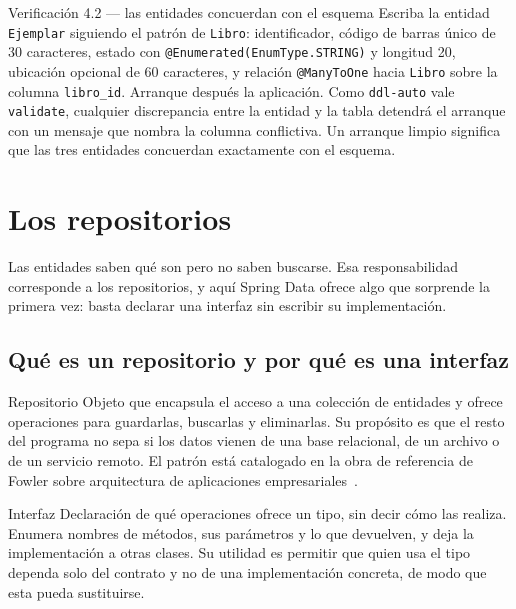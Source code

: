 \documentclass[11pt,a4paper,openany]{book}
\begin{document}
\begin{cajaejercicio}{Verificación 4.2 --- las entidades concuerdan con el esquema}
	Escriba la entidad \texttt{Ejemplar} siguiendo el patrón de \texttt{Libro}: identificador, código de barras único de 30 caracteres, estado con \texttt{@Enumerated(EnumType.STRING)} y longitud 20, ubicación opcional de 60 caracteres, y relación \texttt{@ManyToOne} hacia \texttt{Libro} sobre la columna \texttt{libro\_id}. Arranque después la aplicación. Como \texttt{ddl-auto} vale \texttt{validate}, cualquier discrepancia entre la entidad y la tabla detendrá el arranque con un mensaje que nombra la columna conflictiva. Un arranque limpio significa que las tres entidades concuerdan exactamente con el esquema.
\end{cajaejercicio}

\section{Los repositorios}
\label{sec:repositorios}

Las entidades saben qué son pero no saben buscarse. Esa responsabilidad corresponde a los repositorios, y aquí Spring Data ofrece algo que sorprende la primera vez: basta declarar una interfaz sin escribir su implementación.

\subsection{Qué es un repositorio y por qué es una interfaz}
\label{sec:que-repositorio}

\begin{cajadefinicion}{Repositorio}
	Objeto que encapsula el acceso a una colección de entidades y ofrece operaciones para guardarlas, buscarlas y eliminarlas. Su propósito es que el resto del programa no sepa si los datos vienen de una base relacional, de un archivo o de un servicio remoto. El patrón está catalogado en la obra de referencia de Fowler sobre arquitectura de aplicaciones empresariales~\cite{fowler2002patterns}.
\end{cajadefinicion}

\begin{cajadefinicion}{Interfaz}
	Declaración de qué operaciones ofrece un tipo, sin decir cómo las realiza. Enumera nombres de métodos, sus parámetros y lo que devuelven, y deja la implementación a otras clases. Su utilidad es permitir que quien usa el tipo dependa solo del contrato y no de una implementación concreta, de modo que esta pueda sustituirse.
\end{cajadefinicion}
\end{document}
